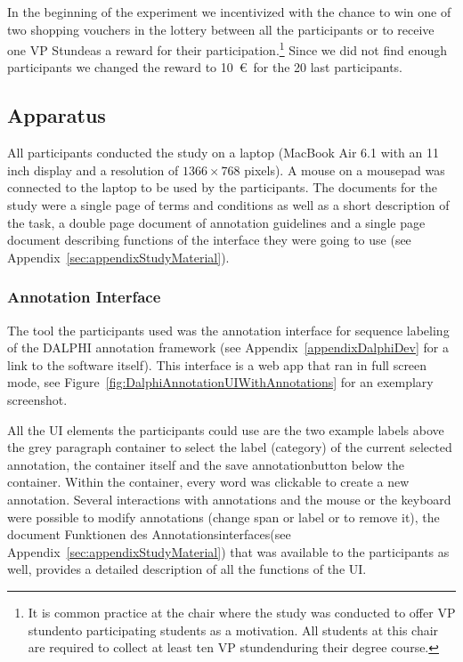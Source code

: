 		In the beginning of the experiment we incentivized with the chance to win one of two shopping vouchers in the lottery between all the participants or to receive one \lqq VP Stunde\rqq as a reward for their participation.\footnote{It is common practice at the chair where the study was conducted to offer \lqq VP stunden\rqq to participating students as a motivation. All students at this chair are required to collect at least ten \lqq VP stunden\rqq during their degree course.}
		Since we did not find enough participants we changed the reward to 10~\euro~for the 20 last participants.

	\subsection{Apparatus}
		All participants conducted the study on a laptop (MacBook Air 6.1 with an 11 inch display and a resolution of \(1366 \times 768\) pixels). A mouse on a mousepad was connected to the laptop to be used by the participants. The documents for the study were a single page of terms and conditions as well as a short description of the task, a double page document of annotation guidelines and a single page document describing functions of the interface they were going to use (see Appendix~\ref{sec:appendixStudyMaterial}).

		\subsubsection{Annotation Interface}
			\label{sec:methodApparatusUI}
			The tool the participants used was the annotation interface for sequence labeling of the \ac{DALPHI} annotation framework (see Appendix~\ref{appendixDalphiDev} for a link to the software itself). This interface is a web app that ran in full screen mode, see Figure~\ref{fig:DalphiAnnotationUIWithAnnotations} for an exemplary screenshot.


			All the \ac{UI} elements the participants could use are the two example labels above the grey paragraph container to select the label (category) of the current selected annotation, the container itself and the \lqq save annotation\rqq button below the container. Within the container, every word was clickable to create a new annotation. Several interactions with annotations and the mouse or the keyboard were possible to modify annotations (change span or label or to remove it), the document \lqq Funktionen des Annotationsinterfaces\rqq (see Appendix~\ref{sec:appendixStudyMaterial}) that was available to the participants as well, provides a detailed description of all the functions of the \ac{UI}.

